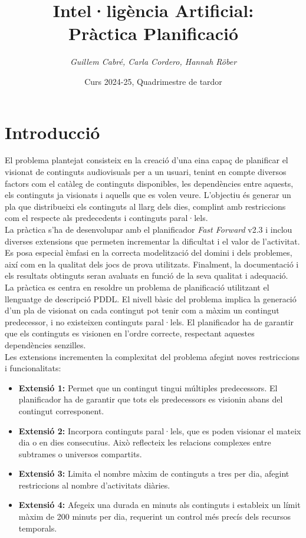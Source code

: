 \documentclass[a4paper]{article}
\title{\textbf{Intel·ligència Artificial:\\
		Pràctica Planificació}}
\author{\emph{Guillem Cabré, Carla Cordero, Hannah Röber}}
\date{Curs 2024-25, Quadrimestre de tardor}
\begin{document}
	
	\begin{titlepage}
		\clearpage\maketitle
		\thispagestyle{empty}
	\end{titlepage}
	
	\tableofcontents
	\clearpage
	
	\section{Introducció}
	
	El problema plantejat consisteix en la creació d'una eina capaç de planificar el visionat de continguts audiovisuals per a un usuari, tenint en compte diversos factors com el catàleg de continguts disponibles, les dependències entre aquests, els continguts ja visionats i aquells que es volen veure. L'objectiu és generar un pla que distribueixi els continguts al llarg dels dies, complint amb restriccions com el respecte als predecedents i continguts paral·lels. \\
	
	La pràctica s'ha de desenvolupar amb el planificador \emph{Fast Forward} v2.3 i inclou diverses extensions que permeten incrementar la dificultat i el valor de l'activitat. Es posa especial èmfasi en la correcta modelització del domini i dels problemes, així com en la qualitat dels jocs de prova utilitzats. Finalment, la documentació i els resultats obtinguts seran avaluats en funció de la seva qualitat i adequació. \\
	
	La pràctica es centra en resoldre un problema de planificació utilitzant el llenguatge de descripció PDDL. El nivell bàsic del problema implica la generació d'un pla de visionat on cada contingut pot tenir com a màxim un contingut predecessor, i no existeixen continguts paral·lels. El planificador ha de garantir que els continguts es visionen en l'ordre correcte, respectant aquestes dependències senzilles. \\
	
	Les extensions incrementen la complexitat del problema afegint noves restriccions i funcionalitats:
	\begin{itemize}
		\item \textbf{Extensió 1:} Permet que un contingut tingui múltiples predecessors. El planificador ha de garantir que tots els predecessors es visionin abans del contingut corresponent.
		\item \textbf{Extensió 2:} Incorpora continguts paral·lels, que es poden visionar el mateix dia o en dies consecutius. Això reflecteix les relacions complexes entre subtrames o universos compartits.
		\item \textbf{Extensió 3:} Limita el nombre màxim de continguts a tres per dia, afegint restriccions al nombre d'activitats diàries.
		\item \textbf{Extensió 4:} Afegeix una durada en minuts als continguts i estableix un límit màxim de 200 minuts per dia, requerint un control més precís dels recursos temporals.
	\end{itemize}
	
\end{document}
